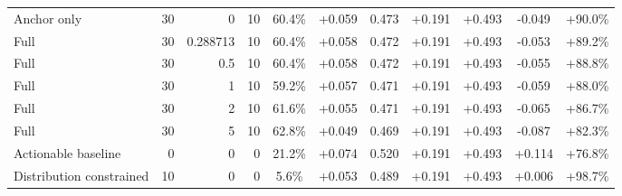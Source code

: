 \begin{table}[htbp]
\begin{tabular}{lrrrccccccc}
Anchor only & 30 & 0 & 10 & 60.4\% & +0.059 & 0.473 & +0.191 & +0.493 & -0.049 & +90.0\% \\
Full & 30 & 0.288713 & 10 & 60.4\% & +0.058 & 0.472 & +0.191 & +0.493 & -0.053 & +89.2\% \\
Full & 30 & 0.5 & 10 & 60.4\% & +0.058 & 0.472 & +0.191 & +0.493 & -0.055 & +88.8\% \\
Full & 30 & 1 & 10 & 59.2\% & +0.057 & 0.471 & +0.191 & +0.493 & -0.059 & +88.0\% \\
Full & 30 & 2 & 10 & 61.6\% & +0.055 & 0.471 & +0.191 & +0.493 & -0.065 & +86.7\% \\
Full & 30 & 5 & 10 & 62.8\% & +0.049 & 0.469 & +0.191 & +0.493 & -0.087 & +82.3\% \\
Actionable baseline & 0 & 0 & 0 & 21.2\% & +0.074 & 0.520 & +0.191 & +0.493 & +0.114 & +76.8\% \\
Distribution constrained & 10 & 0 & 0 & 5.6\% & +0.053 & 0.489 & +0.191 & +0.493 & +0.006 & +98.7\% \\
\bottomrule
\end{tabular}
\end{table}